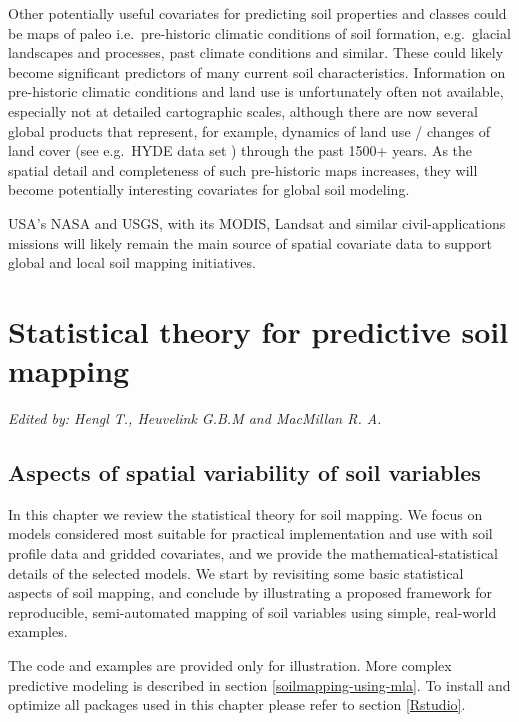 \documentclass[11pt]{krantz}
\theoremstyle{definition}
\theoremstyle{definition}
\theoremstyle{definition}
\theoremstyle{remark}
\begin{document}
Other potentially useful covariates for predicting soil properties and
classes could be maps of paleo i.e.~pre-historic climatic conditions of
soil formation, e.g.~glacial landscapes and processes, past climate
conditions and similar. These could likely become significant predictors
of many current soil characteristics. Information on pre-historic
climatic conditions and land use is unfortunately often not available,
especially not at detailed cartographic scales, although there are now
several global products that represent, for example, dynamics of land
use / changes of land cover (see e.g.~HYDE data set
\citep{klein2011hyde}) through the past 1500+ years. As the spatial
detail and completeness of such pre-historic maps increases, they will
become potentially interesting covariates for global soil modeling.

USA's NASA and USGS, with its MODIS, Landsat and similar
civil-applications missions will likely remain the main source of
spatial covariate data to support global and local soil mapping
initiatives.

\hypertarget{statistical-theory}{%
\chapter{Statistical theory for predictive soil
mapping}\label{statistical-theory}}

\emph{Edited by: Hengl T., Heuvelink G.B.M and MacMillan R. A.}

\hypertarget{aspects-variability}{%
\section{Aspects of spatial variability of soil
variables}\label{aspects-variability}}

In this chapter we review the statistical theory for soil mapping. We
focus on models considered most suitable for practical implementation
and use with soil profile data and gridded covariates, and we provide
the mathematical-statistical details of the selected models. We start by
revisiting some basic statistical aspects of soil mapping, and conclude
by illustrating a proposed framework for reproducible, semi-automated
mapping of soil variables using simple, real-world examples.

The code and examples are provided only for illustration. More complex
predictive modeling is described in section \ref{soilmapping-using-mla}.
To install and optimize all packages used in this chapter please refer
to section \ref{Rstudio}.
\end{document}
